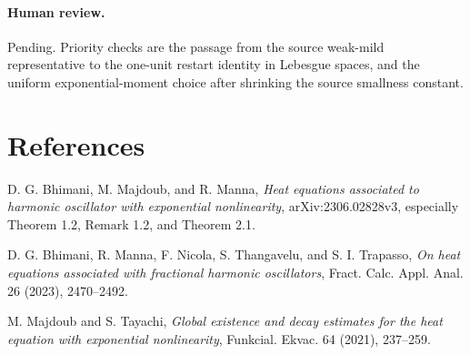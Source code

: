 \documentclass[11pt]{article}
\begin{document}
\paragraph{Human review.}
Pending.  Priority checks are the passage from the source weak-mild
representative to the one-unit restart identity in Lebesgue spaces, and the
uniform exponential-moment choice after shrinking the source smallness
constant.

\section*{References}
\begin{enumerate}[label={[\arabic*]}]
\item D. G. Bhimani, M. Majdoub, and R. Manna,
\emph{Heat equations associated to harmonic oscillator with exponential
nonlinearity}, arXiv:2306.02828v3, especially Theorem 1.2, Remark 1.2, and
Theorem 2.1.
\item D. G. Bhimani, R. Manna, F. Nicola, S. Thangavelu, and
S. I. Trapasso, \emph{On heat equations associated with fractional harmonic
oscillators}, Fract. Calc. Appl. Anal. 26 (2023), 2470--2492.
\item M. Majdoub and S. Tayachi, \emph{Global existence and decay estimates
for the heat equation with exponential nonlinearity}, Funkcial. Ekvac. 64
(2021), 237--259.
\end{enumerate}
\end{document}
